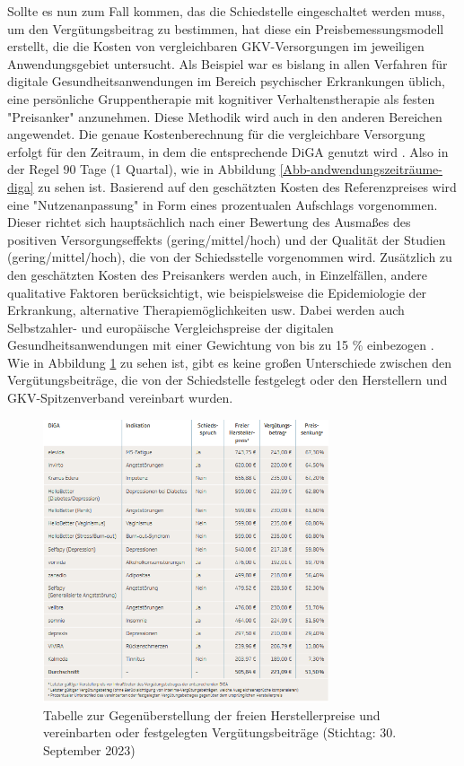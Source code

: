 \documentclass{article}
\begin{document}
			Sollte es nun zum Fall kommen, das die Schiedstelle eingeschaltet werden muss, um den Vergütungsbeitrag zu bestimmen, hat diese ein Preisbemessungsmodell erstellt, die die Kosten von vergleichbaren GKV-Versorgungen im jeweiligen Anwendungsgebiet untersucht. Als Beispiel war es bislang in allen Verfahren für digitale Gesundheitsanwendungen im Bereich psychischer Erkrankungen üblich, eine persönliche Gruppentherapie mit kognitiver Verhaltenstherapie als festen "Preisanker" anzunehmen. Diese Methodik wird auch in den anderen Bereichen angewendet. Die genaue Kostenberechnung für die vergleichbare Versorgung erfolgt für den Zeitraum, in dem die entsprechende DiGA genutzt wird \cite[vgl. S. 13]{TK-Report-2}. Also in der Regel 90 Tage (1 Quartal), wie in Abbildung \ref{Abb-andwendungszeiträume-diga} zu sehen ist. Basierend auf den geschätzten Kosten des Referenzpreises wird eine "Nutzenanpassung" in Form eines prozentualen Aufschlags vorgenommen. Dieser richtet sich hauptsächlich nach einer Bewertung des Ausmaßes des positiven Versorgungseffekts (gering/mittel/hoch) und der Qualität der Studien (gering/mittel/hoch), die von der Schiedsstelle vorgenommen wird. Zusätzlich zu den geschätzten Kosten des Preisankers werden auch, in Einzelfällen, andere qualitative Faktoren berücksichtigt, wie beispielsweise die Epidemiologie der Erkrankung, alternative Therapiemöglichkeiten usw. Dabei werden auch Selbstzahler- und europäische Vergleichspreise der digitalen Gesundheitsanwendungen mit einer Gewichtung von bis zu 15 \% einbezogen \cite[vgl. S. 13]{TK-Report-2}. Wie in Abbildung \ref{Tab-preise-diga} zu sehen ist, gibt es keine großen Unterschiede zwischen den Vergütungsbeiträge, die von der Schiedstelle festgelegt oder den Herstellern und GKV-Spitzenverband vereinbart wurden. 
			\begin{figure}[htbp]
				\centering
				\includegraphics[width=0.75\textwidth]{./grafiken/tabelle_preise_diga}
				\caption[Gegenüberstellung der freien Herstellerpreise und verinbarten oder festgelegten Vergütungsbeiträge]{Tabelle zur Gegenüberstellung der freien Herstellerpreise und vereinbarten oder festgelegten Vergütungsbeiträge (Stichtag: 30. September 2023)}
				\label{Tab-preise-diga}
			\end{figure}
\end{document}
